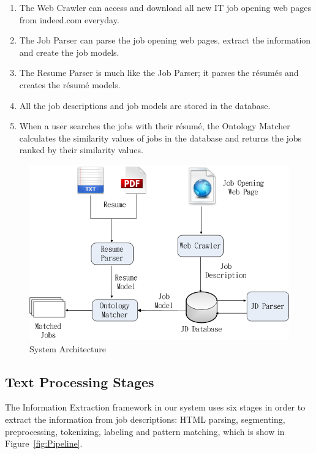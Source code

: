 \begin{enumerate}
    \item The Web Crawler can access and download all new IT job opening web pages from indeed.com everyday.
    \item The Job Parser can parse the job opening web pages, extract the information and create the job models.
    \item The Resume Parser is much like the Job Parser; it parses the r\'esum\'es and creates the r\'esum\'e models.
    \item All the job descriptions and job models are stored in the database.
    \item When a user searches  the jobs with their r\'esum\'e, the Ontology Matcher calculates the similarity values of jobs in the database and returns the jobs ranked by their similarity values.
\end{enumerate}

\begin{figure}[htbp]
  \centering
  \includegraphics[scale=0.5]{images/arch.png}
  \caption{System Architecture}
  \label{fig:arch}
\end{figure}

\subsection{Text Processing Stages}

The Information Extraction framework in our system uses six stages in order to extract the information from job descriptions: HTML parsing, segmenting, preprocessing, tokenizing, labeling and pattern matching, which is show in Figure~\ref{fig:Pipeline}.

